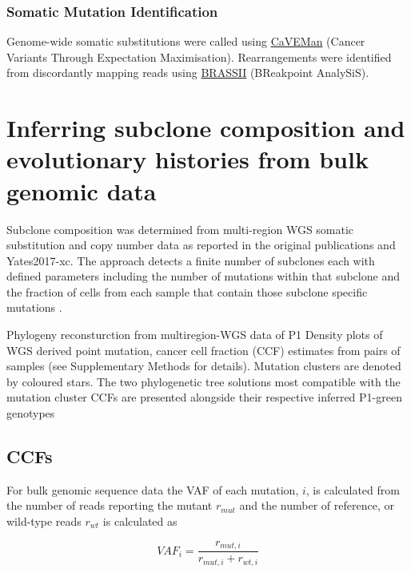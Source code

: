 \subsubsection*{Somatic Mutation Identification}
Genome-wide somatic substitutions were called using \href{http://cancerit.github.io/CaVEMan/}{CaVEMan} (Cancer Variants Through Expectation Maximisation). Rearrangements were identified from discordantly mapping reads using \href{https://github.com/cancerit/BRASS}{BRASSII} (BReakpoint AnalySiS). 

\section{Inferring subclone composition and evolutionary histories from bulk genomic data}
\label{sec:protocol-suppl-evo-history}

Subclone composition was determined from multi-region \ac{WGS} somatic substitution and copy number data as reported in the original publications \textcite{Yates2015-xk} and {Yates2017-xc}. The approach detects a finite number of subclones each with defined parameters including the number of mutations within that subclone and the fraction of cells from each sample that contain those subclone specific mutations .

    {Phylogeny reconsturction from multiregion-\acs{WGS} data of P1}
    {Density plots of WGS derived point mutation, cancer cell fraction (CCF) estimates from pairs of samples (see Supplementary Methods for details). Mutation clusters are denoted by coloured stars. The two phylogenetic tree solutions most compatible with the mutation cluster CCFs are presented alongside their respective inferred P1-green genotypes}


\subsection{\aclp{CCF}}

For bulk genomic sequence data the \acf{VAF} of each mutation, $i$, is calculated from the number of reads reporting the mutant $r_{mut}$ and the number of reference, or wild-type reads $r_{wt}$ is calculated as

\begin{equation}
    VAF_i = \frac{r_{mut,i}}{r_{mut,i} + r_{wt,i}}
\end{equation}

